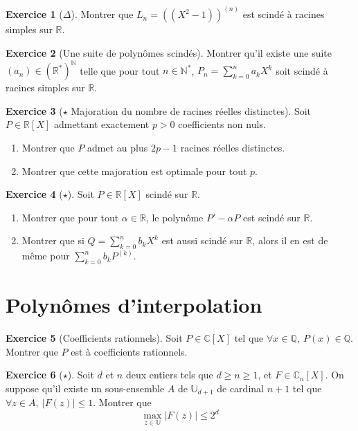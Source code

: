 \documentclass[french]{book}
\newcommand{\N}{\mathbb{N}}
\newcommand{\Q}{\mathbb{Q}}
\newcommand{\R}{\mathbb{R}}
\newcommand{\C}{\mathbb{C}}
\newcommand{\U}{\mathbb{U}}
\newcommand{\st}{^*}
\theoremstyle{definition}
\newtheorem{ex}{Exercice}[chapter]
\theoremstyle{theorem}
\theoremstyle{remark}
\begin{document}
\begin{ex}[$\Delta$]
	Montrer que $L_n=\left((X^2-1)\right)^{(n)}$ est scindé à racines simples sur $\R$.
\end{ex}

\begin{ex}[Une suite de polynômes scindés]
	Montrer qu'il existe une suite $(a_n)\in(\R\st)^\N$ telle que pour tout $n\in\N\st$, $P_n=\displaystyle\sum_{k=0}^{n}a_kX^k$ soit scindé à racines simples sur $\R$.
\end{ex}

\begin{ex}[$\star$ Majoration du nombre de racines réelles distinctes]
	Soit $P\in\R[X]$ admettant exactement $p>0$ coefficients non nuls.
	\begin{enumerate}
		\item Montrer que $P$ admet au plus $2p-1$ racines réelles distinctes.
		\item Montrer que cette majoration est optimale pour tout $p$.
	\end{enumerate}
\end{ex}

\begin{ex}[$\star$]
	Soit $P\in\R[X]$ scindé sur $\R$.
	\begin{enumerate}
		\item Montrer que pour tout $\alpha\in\R$, le polynôme $P'-\alpha P$ est scindé sur $\R$.
		\item Montrer que si $Q=\displaystyle\sum_{k=0}^{n}b_kX^k$ est aussi scindé sur $\R$, alors il en est de même pour $\displaystyle\sum_{k=0}^{n}b_kP^{(k)}$.
	\end{enumerate}
\end{ex}

\section{Polynômes d'interpolation}

\begin{ex}[Coefficients rationnels]
	Soit $P \in \C[X]$ tel que $\forall x \in \Q, \ P(x)\in\Q$. Montrer que $P$ est à coefficients rationnels.
\end{ex}

\begin{ex}[$\star$]
	Soit $d$ et $n$ deux entiers tels que $d\geqslant n\geqslant 1$, et $F\in\C_n[X]$. On suppose qu'il existe un sous-ensemble $A$ de $\U_{d+1}$ de cardinal $n+1$ tel que $\forall z\in A,\ \lvert F(z)\rvert\leqslant 1$. Montrer que $$\max_{z\in\U}\lvert F(z)\rvert\leqslant 2^d$$
\end{ex}
\end{document}
